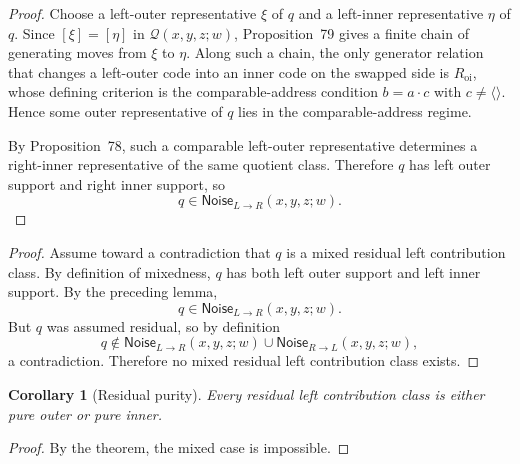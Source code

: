 \documentclass[11pt]{article}
\newtheorem{corollary}[theorem]{Corollary}
\newcommand{\Qclass}{\mathcal{Q}}
\newcommand{\Noise}{\mathsf{Noise}}
\begin{document}
\begin{proof}
Choose a left-outer representative \(\xi\) of \(q\) and a left-inner
representative \(\eta\) of \(q\). Since \([\xi]=[\eta]\) in
\(\Qclass(x,y,z;w)\), Proposition~79 gives a finite chain of generating moves
from \(\xi\) to \(\eta\). Along such a chain, the only generator relation that
changes a left-outer code into an inner code on the swapped side is
\(R_{\mathrm{oi}}\), whose defining criterion is the comparable-address
condition \(b=a\cdot c\) with \(c\neq \langle\rangle\). Hence some outer
representative of \(q\) lies in the comparable-address regime.

By Proposition~78, such a comparable left-outer representative determines a
right-inner representative of the same quotient class. Therefore \(q\) has left
outer support and right inner support, so
\[
q\in \Noise_{L\to R}(x,y,z;w).
\]
\end{proof}

\begin{proof}
Assume toward a contradiction that \(q\) is a mixed residual left
contribution class. By definition of mixedness, \(q\) has both left outer
support and left inner support. By the preceding lemma,
\[
q\in \Noise_{L\to R}(x,y,z;w).
\]
But \(q\) was assumed residual, so by definition
\[
q\notin \Noise_{L\to R}(x,y,z;w)\cup \Noise_{R\to L}(x,y,z;w),
\]
a contradiction. Therefore no mixed residual left contribution class exists.
\end{proof}

\begin{corollary}[Residual purity]
Every residual left contribution class is either pure outer or pure inner.
\end{corollary}

\begin{proof}
By the theorem, the mixed case is impossible.
\end{proof}
\end{document}
